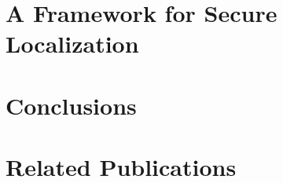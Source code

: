 \documentclass[11pt]{book}
\begin{document}
\chapter{A Framework for Secure Localization}
\label{ch:chap4}



\chapter{Conclusions}
\label{ch:conc}



\chapter*{Related Publications}
\label{ch:relatedPubs}




 
\end{document}
